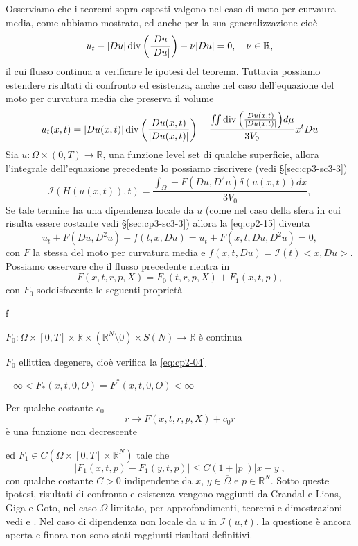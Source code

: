 \begin{osservazione}
Osserviamo che i teoremi sopra esposti valgono nel caso di moto per curvaura media, come abbiamo mostrato,  ed anche per la sua  generalizzazione cioè
\[
u_t -|Du|\operatorname{div}\left(\frac{Du}{|Du|}\right) - \nu|Du| = 0,\quad\nu\in\mathbb{R},
\]
il cui flusso continua a verificare le ipotesi del teorema.
 Tuttavia possiamo estendere risultati di confronto ed esistenza, anche nel caso dell'equazione del moto per curvatura media che preserva il volume
\begin{equation}
  \label{eq:cp2-15}
  u_t(x,t)=|Du(x,t)|\operatorname{div}{\left(\frac{Du(x,t)}{|Du(x,t)|}\right)}-\frac{\iint\operatorname{div}{\left(\frac{Du(x,t)}{|Du(x,t)|}\right)}d\mu}{3V_0}x^tDu
\end{equation}
Sia $u:\Omega\times(0,T)\to\mathbb{R}$, una funzione level set di qualche superficie, allora l'integrale dell'equazione precedente lo possiamo riscrivere (vedi §\ref{sec:cp3-sc3-3})
\[
\mathcal{I}(H(u(x,t)),t)=\frac{\int_{\Omega}-F(Du,D^2u)\delta(u(x,t))dx}{3V_0},
\]
Se tale termine ha una dipendenza locale da $u$ (come nel caso della
sfera in cui risulta essere costante vedi §\ref{sec:cp3-sc3-3}) allora la \eqref{eq:cp2-15} diventa
\[
u_t + F(Du,D^2u) + f(t,x,Du) = u_t +\tilde{F}(x,t,Du,D^2u)=0,
\]
con $F$ la stessa del moto per curvatura media e $f(x,t,Du)=\mathcal{I}(t)<x,Du>$.
Possiamo osservare che il flusso precedente rientra in 
\begin{equation}
\label{eq:cp2-16}
F(x,t,r,p,X) = F_0(t,r,p,X)+F_1(x,t,p),
\end{equation}
con $F_0$ soddisfacente le seguenti proprietà
\begin{enump}{f}
  \item $F_0:\overline{\Omega}\times[0,T]\times\mathbb{R}\times(\mathbb{R}^N\setminus{0})\times S(N)\to\mathbb{R}$ è continua
  \item $F_0$ ellittica degenere, cioè verifica la \eqref{eq:cp2-04}
  \item $ -\infty<F_*(x,t,0,O) = F^*(x,t,0,O)<\infty$
  \item Per qualche costante $c_0$ 
\[
      r\to F(x,t,r,p,X)+c_0r
\]
è una funzione non decrescente
\end{enump}
ed $F_1\in C(\overline{\Omega}\times[0,T]\times\mathbb{R}^N)$ tale che
\[
|F_1(x,t,p)-F_1(y,t,p)|\leq C(1+|p|)|x-y|,
\]
con qualche costante $C>0$ indipendente da $x$,
$y\in\overline{\Omega}$ e $p\in\mathbb{R}^N$. Sotto queste ipotesi,
risultati di confronto e esistenza vengono raggiunti da Crandal e
Lions, Giga e Goto, nel caso $\Omega$ limitato, per approfondimenti,
teoremi e dimostrazioni vedi \cite[][§3]{giga:main} e
\cite[][§8]{crand:lion}.
Nel caso di dipendenza non locale da $u$ in $\mathcal{I}(u,t)$, la
questione è ancora aperta e finora non sono stati raggiunti
risultati definitivi.
\end{osservazione}



